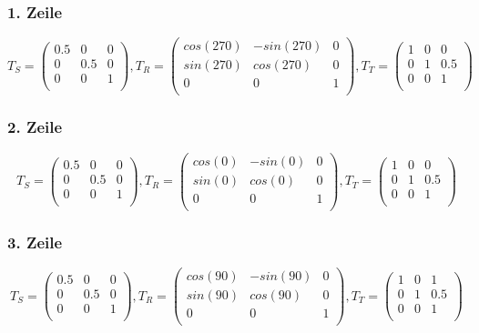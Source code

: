 \documentclass[]{article}
\begin{document}
\subsubsection*{1. Zeile}
\[
T_S = \begin{pmatrix}
0.5 & 0 & 0 \\
0 & 0.5 & 0\\
0 & 0 & 1 \\
\end{pmatrix},
T_R = \begin{pmatrix}
cos(270) & -sin(270) & 0 \\
sin(270) & cos(270) & 0 \\
0 & 0 & 1 \\
\end{pmatrix},
T_T = \begin{pmatrix}
1 & 0 & 0 \\
0 & 1 & 0.5 \\
0 & 0 & 1 \\
\end{pmatrix}
\]

\subsubsection*{2. Zeile}
\[
T_S = \begin{pmatrix}
0.5 & 0 & 0 \\
0 & 0.5 & 0 \\
0 & 0 & 1 \\
\end{pmatrix},
T_R = \begin{pmatrix}
cos(0) & -sin(0) & 0 \\
sin(0) & cos(0) & 0 \\
0 & 0 & 1 \\
\end{pmatrix},
T_T = \begin{pmatrix}
1 & 0 & 0 \\
0 & 1 & 0.5 \\
0 & 0 & 1 \\
\end{pmatrix}
\]

\subsubsection*{3. Zeile}
\[
T_S = \begin{pmatrix}
0.5 & 0 & 0 \\
0 & 0.5 & 0 \\
0 & 0 & 1 \\
\end{pmatrix},
T_R = \begin{pmatrix}
cos(90) & -sin(90) & 0 \\
sin(90) & cos(90) & 0 \\
0 & 0 & 1 \\
\end{pmatrix},
T_T = \begin{pmatrix}
1 & 0 & 1 \\
0 & 1 & 0.5 \\
0 & 0 & 1 \\
\end{pmatrix}
\]
\end{document}
